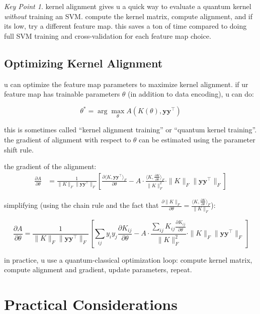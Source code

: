 \documentclass[11pt,a4paper]{article}
\theoremstyle{definition}
\theoremstyle{remark}
\newtheorem*{keypoint}{Key Point}
\begin{document}
\begin{keypoint}
kernel alignment gives u a quick way to evaluate a quantum kernel \emph{without} training an SVM. compute the kernel matrix, compute alignment, and if its low, try a different feature map. this saves a ton of time compared to doing full SVM training and cross-validation for each feature map choice.
\end{keypoint}

\subsection{Optimizing Kernel Alignment}

u can optimize the feature map parameters to maximize kernel alignment. if ur feature map has trainable parameters $\theta$ (in addition to data encoding), u can do:

\[
\theta^* = \arg\max_\theta A(K(\theta), \mathbf{y}\mathbf{y}^\top)
\]

this is sometimes called ``kernel alignment training'' or ``quantum kernel training''. the gradient of alignment with respect to $\theta$ can be estimated using the parameter shift rule.

the gradient of the alignment:
\begin{align}
\frac{\partial A}{\partial \theta} &= \frac{1}{\|K\|_F \|\mathbf{y}\mathbf{y}^\top\|_F} \left[ \frac{\partial \langle K, \mathbf{y}\mathbf{y}^\top \rangle_F}{\partial \theta} - A \cdot \frac{\langle K, \frac{\partial K}{\partial \theta} \rangle_F}{\|K\|_F^2} \cdot \|K\|_F \|\mathbf{y}\mathbf{y}^\top\|_F \right]
\end{align}

simplifying (using the chain rule and the fact that $\frac{\partial \|K\|_F}{\partial \theta} = \frac{\langle K, \frac{\partial K}{\partial \theta}\rangle_F}{\|K\|_F}$):

\[
\frac{\partial A}{\partial \theta} = \frac{1}{\|K\|_F \|\mathbf{y}\mathbf{y}^\top\|_F} \left[\sum_{ij} y_i y_j \frac{\partial K_{ij}}{\partial \theta} - A \cdot \frac{\sum_{ij} K_{ij} \frac{\partial K_{ij}}{\partial \theta}}{\|K\|_F^2} \cdot \|K\|_F \|\mathbf{y}\mathbf{y}^\top\|_F\right]
\]

in practice, u use a quantum-classical optimization loop: compute kernel matrix, compute alignment and gradient, update parameters, repeat.

\section{Practical Considerations}
\end{document}
